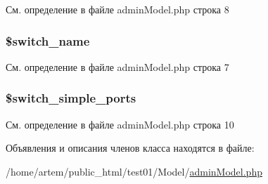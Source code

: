 См. определение в файле admin\-Model.\-php строка 8

\hypertarget{classadmin_model_ac4551d8a2764c22fc62f61d13b12670f}{
\subsubsection[{\$switch\-\_\-name}]{\setlength{\rightskip}{0pt plus 5cm}\$switch\-\_\-name}}\label{classadmin_model_ac4551d8a2764c22fc62f61d13b12670f}


См. определение в файле admin\-Model.\-php строка 7

\hypertarget{classadmin_model_a1f184554798f3454ffece10936bd9990}{
\subsubsection[{\$switch\-\_\-simple\-\_\-ports}]{\setlength{\rightskip}{0pt plus 5cm}\$switch\-\_\-simple\-\_\-ports}}\label{classadmin_model_a1f184554798f3454ffece10936bd9990}


См. определение в файле admin\-Model.\-php строка 10



Объявления и описания членов класса находятся в файле\-:\begin{DoxyCompactItemize}
\item 
/home/artem/public\-\_\-html/test01/\-Model/\hyperlink{admin_model_8php}{admin\-Model.\-php}\end{DoxyCompactItemize}
